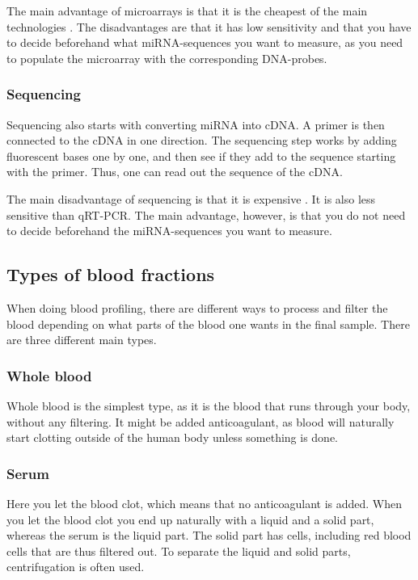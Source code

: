 The main advantage of microarrays is that it is the cheapest of the main technologies \citep{mirnatech}. The disadvantages are that it has low sensitivity and that you have to decide beforehand what miRNA-sequences you want to measure, as you need to populate the microarray with the corresponding DNA-probes.  

\subsubsection{Sequencing}
Sequencing also starts with converting miRNA into cDNA. A primer is then connected to the cDNA in one direction. The sequencing step works by adding fluorescent bases one by one, and then see if they add to the sequence starting with the primer. Thus, one can read out the sequence of the cDNA.

The main disadvantage of sequencing is that it is expensive \citep{mirnatech}. It is also less sensitive than qRT-PCR. The main advantage, however, is that you do not need to decide beforehand the miRNA-sequences you want to measure.

\subsection{Types of blood fractions}
\label{met:blood_fluid}

When doing blood profiling, there are different ways to process and filter the blood depending on what parts of the blood one wants in the final sample. There are three different main types.

\subsubsection{Whole blood}
Whole blood is the simplest type, as it is the blood that runs through your body, without any filtering. It might be added anticoagulant, as blood will naturally start clotting outside of the human body unless something is done.

\subsubsection{Serum}
Here you let the blood clot, which means that no anticoagulant is added. When you let the blood clot you end up naturally with a liquid and a solid part, whereas the serum is the liquid part. The solid part has cells, including red blood cells that are thus filtered out. To separate the liquid and solid parts, centrifugation is often used.

